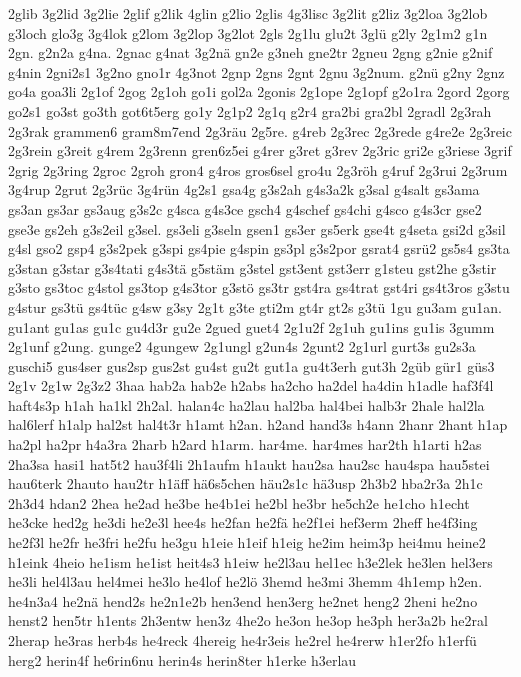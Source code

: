 {2glib
3g2lid
3g2lie
2glif
g2lik
4glin
g2lio
2glis
4g3lisc
3g2lit
g2liz
3g2loa
3g2lob
g3loch
glo3g
3g4lok
g2lom
3g2lop
3g2lot
2gls
2g1lu
glu2t
3glü
g2ly
2g1m2
g1n
2gn.
g2n2a
g4na.
2gnac
g4nat
3g2nä
gn2e
g3neh
gne2tr
2gneu
2gng
g2nie
g2nif
g4nin
2gni2s1
3g2no
gno1r
4g3not
2gnp
2gns
2gnt
2gnu
3g2num.
g2nü
g2ny
2gnz
go4a
goa3li
2g1of
2gog
2g1oh
go1i
gol2a
2gonis
2g1ope
2g1opf
g2o1ra
2gord
2gorg
go2s1
go3st
go3th
got6t5erg
go1y
2g1p2
2g1q
g2r4
gra2bi
gra2bl
2gradl
2g3rah
2g3rak
grammen6
gram8m7end
2g3räu
2g5re.
g4reb
2g3rec
2g3rede
g4re2e
2g3reic
2g3rein
g3reit
g4rem
2g3renn
gren6z5ei
g4rer
g3ret
g3rev
2g3ric
gri2e
g3riese
3grif
2grig
2g3ring
2groc
2groh
gron4
g4ros
gros6sel
gro4u
2g3röh
g4ruf
2g3rui
2g3rum
3g4rup
2grut
2g3rüc
3g4rün
4g2s1
gsa4g
g3s2ah
g4s3a2k
g3sal
g4salt
gs3ama
gs3an
gs3ar
gs3aug
g3s2c
g4sca
g4s3ce
gsch4
g4schef
gs4chi
g4sco
g4s3cr
gse2
gse3e
gs2eh
g3s2eil
g3sel.
gs3eli
g3seln
gsen1
gs3er
gs5erk
gse4t
g4seta
gsi2d
g3sil
g4sl
gso2
gsp4
g3s2pek
g3spi
gs4pie
g4spin
gs3pl
g3s2por
gsrat4
gsrü2
gs5s4
gs3ta
g3stan
g3star
g3s4tati
g4s3tä
g5stäm
g3stel
gst3ent
gst3err
g1steu
gst2he
g3stir
g3sto
gs3toc
g4stol
gs3top
g4s3tor
g3stö
gs3tr
gst4ra
gs4trat
gst4ri
gs4t3ros
g3stu
g4stur
gs3tü
gs4tüc
g4sw
g3sy
2g1t
g3te
gti2m
gt4r
gt2s
g3tü
1gu
gu3am
gu1an.
gu1ant
gu1as
gu1c
gu4d3r
gu2e
2gued
guet4
2g1u2f
2g1uh
gu1ins
gu1is
3gumm
2g1unf
g2ung.
gunge2
4gungew
2g1ungl
g2un4s
2gunt2
2g1url
gurt3s
gu2s3a
guschi5
gus4ser
gus2sp
gus2st
gu4st
gu2t
gut1a
gu4t3erh
gut3h
2güb
gür1
güs3
2g1v
2g1w
2g3z2
3haa
hab2a
hab2e
h2abs
ha2cho
ha2del
ha4din
h1adle
haf3f4l
haft4s3p
h1ah
ha1kl
2h2al.
halan4c
ha2lau
hal2ba
hal4bei
halb3r
2hale
hal2la
hal6lerf
h1alp
hal2st
hal4t3r
h1amt
h2an.
h2and
hand3s
h4ann
2hanr
2hant
h1ap
ha2pl
ha2pr
h4a3ra
2harb
h2ard
h1arm.
har4me.
har4mes
har2th
h1arti
h2as
2ha3sa
hasi1
hat5t2
hau3f4li
2h1aufm
h1aukt
hau2sa
hau2sc
hau4spa
hau5stei
hau6terk
2hauto
hau2tr
h1äff
hä6s5chen
häu2s1c
hä3usp
2h3b2
hba2r3a
2h1c
2h3d4
hdan2
2hea
he2ad
he3be
he4b1ei
he2bl
he3br
he5ch2e
he1cho
h1echt
he3cke
hed2g
he3di
he2e3l
hee4s
he2fan
he2fä
he2f1ei
hef3erm
2heff
he4f3ing
he2f3l
he2fr
he3fri
he2fu
he3gu
h1eie
h1eif
h1eig
he2im
heim3p
hei4mu
heine2
h1eink
4heio
he1ism
he1ist
heit4s3
h1eiw
he2l3au
hel1ec
h3e2lek
he3len
hel3ers
he3li
hel4l3au
hel4mei
he3lo
he4lof
he2lö
3hemd
he3mi
3hemm
4h1emp
h2en.
he4n3a4
he2nä
hend2s
he2n1e2b
hen3end
hen3erg
he2net
heng2
2heni
he2no
henst2
hen5tr
h1ents
2h3entw
hen3z
4he2o
he3on
he3op
he3ph
her3a2b
he2ral
2herap
he3ras
herb4s
he4reck
4hereig
he4r3eis
he2rel
he4rerw
h1er2fo
h1erfü
herg2
herin4f
he6rin6nu
herin4s
herin8ter
h1erke
h3erlau
}

